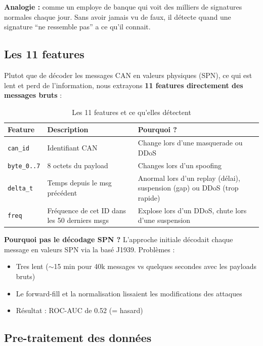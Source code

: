 \documentclass[12pt,a4paper]{article}
\begin{document}
\textbf{Analogie :} comme un employe de banque qui voit des milliers de signatures normales chaque jour. Sans avoir jamais vu de faux, il détecte quand une signature ``ne ressemble pas'' a ce qu'il connait.

\subsection{Les 11 features}

Plutot que de décoder les messages CAN en valeurs physiques (SPN), ce qui est lent et perd de l'information, nous extrayons \textbf{11 features directement des messages bruts} :

\begin{table}[H]
\centering
\begin{tabular}{llp{5.5cm}}
\toprule
\textbf{Feature} & \textbf{Description} & \textbf{Pourquoi ?} \\
\midrule
\texttt{can\_id} & Identifiant CAN & Change lors d'une masquerade ou DDoS \\
\texttt{byte\_0..7} & 8 octets du payload & Changes lors d'un spoofing \\
\texttt{delta\_t} & Temps depuis le msg précédent & Anormal lors d'un replay (délai), suspension (gap) ou DDoS (trop rapide) \\
\texttt{freq} & Fréquence de cet ID dans les 50 derniers msgs & Explose lors d'un DDoS, chute lors d'une suspension \\
\bottomrule
\end{tabular}
\caption{Les 11 features et ce qu'elles détectent}
\end{table}

\textbf{Pourquoi pas le décodage SPN ?} L'approche initiale décodait chaque message en valeurs SPN via la basé J1939. Problèmes :
\begin{itemize}[noitemsep]
    \item Tres lent ($\sim$15 min pour 40k messages vs quelques secondes avec les payloads bruts)
    \item Le forward-fill et la normalisation lissaient les modifications des attaques
    \item Résultat : ROC-AUC de 0.52 (= hasard)
\end{itemize}

\subsection{Pre-traitement des données}
\end{document}
